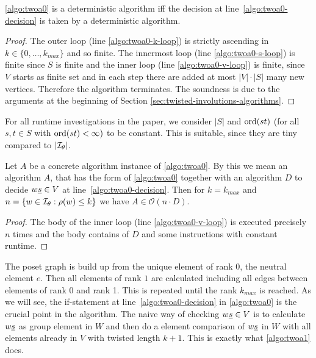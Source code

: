 \begin{lemm}
	\ref{algo:twoa0} is a deterministic algorithm iff the decision at line~\ref{algo:twoa0-decision} is taken by a deterministic algorithm.

	\begin{proof}
		The outer loop (line \ref{algo:twoa0-k-loop}) is strictly ascending in $k \in \{0,\ldots,k_{max}\}$ and so finite. The innermost loop (line \ref{algo:twoa0-s-loop}) is finite since $S$ is finite and the inner loop (line \ref{algo:twoa0-v-loop}) is finite, since $V$ starts as finite set and in each step there are added at most $|V| \cdot |S|$ many new vertices. Therefore the algorithm terminates. The soundness is due to the arguments at the beginning of Section \ref{sec:twisted-involutions-algorithms}.
	\end{proof}
\end{lemm}

For all runtime investigations in the paper, we consider $|S|$ and $\operatorname{ord}(st)$ (for all $s,t \in S$ with $\operatorname{ord}(st) < \infty)$ to be constant. This is suitable, since they are tiny compared to $|\mathcal{I}_{\theta}|$. 

\begin{prop}
	Let $A$ be a concrete algorithm instance of \ref{algo:twoa0}. By this we mean an algorithm $A$, that has the form of \ref{algo:twoa0} together with an algorithm $D$ to decide $w \underline{s} \in V$ at line~\ref{algo:twoa0-decision}. Then for $k = k_{max}$ and $n = \{ w \in \mathcal{I}_{\theta} : \rho(w) \leq k \}$ we have $A \in \mathcal{O}(n \cdot D)$.

	\begin{proof}
		The body of the inner loop (line \ref{algo:twoa0-v-loop}) is executed precisely $n$ times and the body contains of $D$ and some instructions with constant runtime.
	\end{proof}
\end{prop}

The poset graph is build up from the unique element of rank 0, the neutral element $e$. Then all elements of rank $1$ are calculated including all edges between elements of rank 0 and rank 1. This is repeated until the rank $k_{max}$ is reached. As we will see, the if-statement at line~\ref{algo:twoa0-decision} in \ref{algo:twoa0} is the crucial point in the algorithm. The naive way of checking $w \underline{s} \in V$ is to calculate $w \underline{s}$ as group element in $W$ and then do a element comparison of $w \underline{s}$ in $W$ with all elements already in $V$ with twisted length $k+1$. This is exactly what \ref{algo:twoa1} does.

